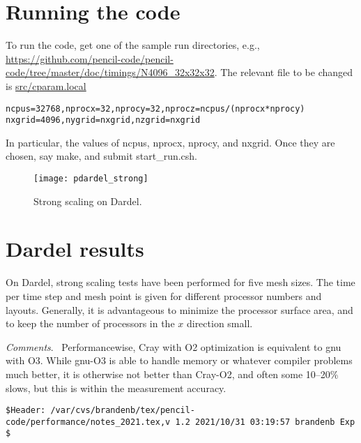 \documentclass[twocolumn]{article}
\begin{document}
\section{Running the code}

To run the code, get one of the sample run directories, e.g.,
\url{https://github.com/pencil-code/pencil-code/tree/master/doc/timings/N4096_32x32x32}.
The relevant file to be changed is \url{src/cparam.local}
\scriptsize
\begin{verbatim}
ncpus=32768,nprocx=32,nprocy=32,nprocz=ncpus/(nprocx*nprocy)
nxgrid=4096,nygrid=nxgrid,nzgrid=nxgrid
\end{verbatim}
\normalsize
In particular, the values of ncpus, nprocx, nprocy, and nxgrid.
Once they are chosen, say make, and submit
start\_run.csh.

\begin{figure}[b!]\begin{center}
\texttt{[image: pdardel\_strong]}
\end{center}\caption[]{
Strong scaling on Dardel.
}\label{pdardel_strong}\end{figure}

\section{Dardel results}

On Dardel, strong scaling tests have been performed
for five mesh sizes.
The time per time step and mesh point is given for
different processor numbers and layouts.
Generally, it is advantageous to minimize the
processor surface area, and to keep the number
of processors in the $x$ direction small.

{\em Comments}.~
Performancewise, Cray with O2 optimization is equivalent to gnu with O3.
While gnu-O3 is able to handle memory or whatever compiler problems much
better, it is otherwise not better than Cray-O2, and often some 10--20\%
slows, but this is within the measurement accuracy.




\vfill\bigskip\noindent\tiny\begin{verbatim}
$Header: /var/cvs/brandenb/tex/pencil-code/performance/notes_2021.tex,v 1.2 2021/10/31 03:19:57 brandenb Exp $
\end{verbatim}
\end{document}
